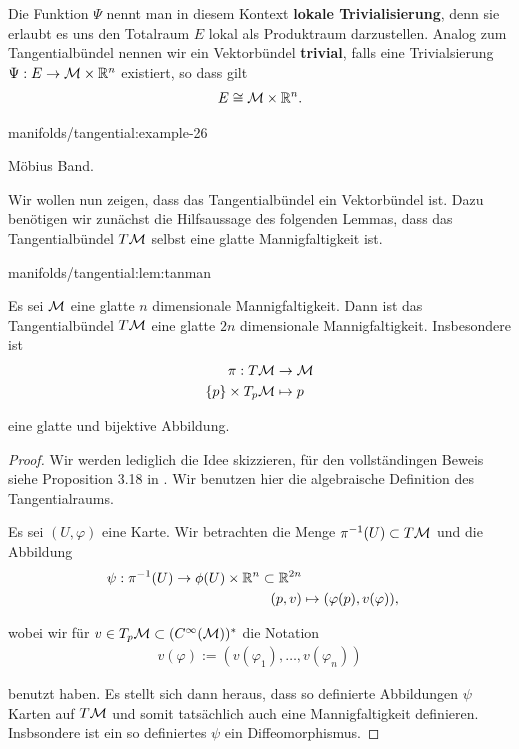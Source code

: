 \par
Die Funktion \(\Psi\) nennt man in diesem Kontext \textbf{lokale Trivialisierung}, denn sie erlaubt es uns den Totalraum \(E\) lokal als Produktraum darzustellen.
Analog zum Tangentialbündel nennen wir ein Vektorbündel \textbf{trivial}, falls eine Trivialsierung \(\Psi:E\to \mathcal{M}\times\mathbb{R}^n\) existiert, so dass gilt
\begin{align*}
E \cong \mathcal{M}\times\mathbb{R}^n.
\end{align*}\begin{example}{}{manifolds/tangential:example-26}



\par
Möbius Band.
\end{example}

\par
Wir wollen nun zeigen, dass das Tangentialbündel ein Vektorbündel ist.
Dazu benötigen wir zunächst die Hilfsaussage des folgenden Lemmas, dass das Tangentialbündel \(T\mathcal{M}\) selbst eine glatte Mannigfaltigkeit ist.
\begin{lemma}{}{manifolds/tangential:lem:tanman}



\par
Es sei \(\mathcal{M}\) eine glatte \(n\) dimensionale Mannigfaltigkeit.
Dann ist das Tangentialbündel \(T\mathcal{M}\) eine glatte \(2n\) dimensionale Mannigfaltigkeit.
Insbesondere ist
\begin{align*}
\pi:T\mathcal{M} &\to \mathcal{M}\\
\{p\}\times T_p\mathcal{M} &\mapsto p
\end{align*}
\par
eine glatte und bijektive Abbildung.
\end{lemma}

\begin{proof}
 Wir werden lediglich die Idee skizzieren, für den vollständingen Beweis siehe Proposition 3.18 in \cite{Lee03}.
Wir benutzen hier die algebraische Definition des Tangentialraums.

\par
Es sei \((U,\varphi)\) eine Karte.
Wir betrachten die Menge \(\pi^{-1}(U)\subset T\mathcal{M}\) und die Abbildung
\begin{align*}
\psi:\pi^{-1}(U) \to \phi(U)\times \mathbb{R}^{n}\subset\mathbb{R}^{2n}\\
(p,v) &\mapsto (\varphi(p), v(\varphi)),
\end{align*}
\par
wobei wir für \(v\in T_p\mathcal{M}\subset (C^\infty(\mathcal{M}))^\ast\) die Notation
\begin{align*}
v(\varphi) := (v(\varphi_1),\ldots, v(\varphi_n))
\end{align*}
\par
benutzt haben.
Es stellt sich dann heraus, dass so definierte Abbildungen \(\psi\) Karten auf \(T\mathcal{M}\) und somit tatsächlich auch eine Mannigfaltigkeit definieren.
Insbsondere ist ein so definiertes \(\psi\) ein Diffeomorphismus.
\end{proof}


